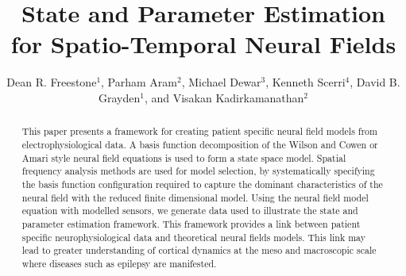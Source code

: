 \documentclass[12pt]{iopart}
\begin{document}

\title[State and Parameter Estimation for Spatio-Temporal Neural Fields]{State and Parameter Estimation for Spatio-Temporal Neural Fields}

\author{Dean R. Freestone$^1$, Parham Aram$^2$, Michael Dewar$^3$, Kenneth Scerri$^4$, David B. Grayden$^1$, and Visakan Kadirkamanathan$^2$}

\address{$^1$ Department of Electrical and Electronic Engineering, University of Melbourne, Melbourne, Vic, 3010 Australia} \address{$^2$ Department of Automatic Control and Systems Engineering, University of Sheffield, Mappin Street, Sheffield, S1 3JD, UK} \address{$^3$ Department of Applied Physics and Applied Mathematics, Columbia University, US} \address{$^4$ Ken's}  

\begin{abstract}
	This paper presents a framework for creating patient specific neural field models from electrophysiological data. A basis function decomposition of the Wilson and Cowen or Amari style neural field equations is used to form a state space model. Spatial frequency analysis methods are used for model selection, by systematically specifying the basis function configuration required to capture the dominant characteristics of the neural field with the reduced finite dimensional model. Using the neural field model equation with modelled sensors, we generate data used to illustrate the state and parameter estimation framework. This framework provides a link between patient specific neurophysiological data and theoretical neural fields models. This link may lead to greater understanding of cortical dynamics at the meso and macroscopic scale where diseases such as epilepsy are manifested.   
\end{abstract}

\maketitle
\end{document}
